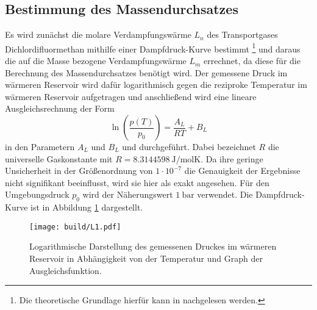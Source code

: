 \subsection{Bestimmung des Massendurchsatzes}
Es wird zunächst die molare Verdampfungswärme $L_n$ des Transportgases
Dichlordifluormethan mithilfe einer Dampfdruck-Kurve bestimmt
\footnote{Die theoretische Grundlage hierfür kann in \cite{dampfdruck} nachgelesen
werden.} und daraus die auf die Masse bezogene Verdampfungswärme $L_m$ errechnet, da
diese für die Berechnung des Massendurchsatzes benötigt wird.
Der gemessene Druck im wärmeren Reservoir wird dafür logarithmisch gegen die reziproke Temperatur im
wärmeren Reservoir aufgetragen und anschließend wird eine lineare Ausgleichsrechnung
der Form
\begin{equation}
  \ln\left(\frac{p(T)}{p_0}\right)= \frac{A_L}{R T} + B_L
\end{equation}
in den Parametern $A_L$ und $B_L$ und durchgeführt. Dabei bezeichnet $R$ die universelle Gaskonstante mit
$R = \SI{8.3144598}{\joule\per\mol\kelvin}$. Da ihre geringe Unsicherheit in der Größenordnung
von $1 \cdot 10^{-7}$ die Genauigkeit der Ergebnisse nicht signifikant beeinflusst, wird
sie hier als exakt angesehen.
Für den Umgebungsdruck $p_0$ wird der Näherungswert $\SI{1}{\bar}$ verwendet.
Die Dampfdruck-Kurve ist in Abbildung \ref{fig:dampf} dargestellt.

\begin{figure}
  \centering
  \texttt{[image: build/L1.pdf]}
  \caption{Logarithmische Darstellung des gemessenen Druckes im wärmeren Reservoir
   in Abhängigkeit von der Temperatur und Graph der Ausgleichsfunktion.}
  \label{fig:dampf}
\end{figure}

